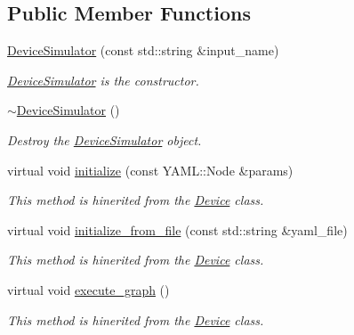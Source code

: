 \subsection*{Public Member Functions}
\begin{DoxyCompactItemize}
\item 
\hyperlink{classdynamic__graph_1_1DeviceSimulator_ad1c52d0a4bfa4617c7653532570a2c90}{Device\+Simulator} (const std\+::string \&input\+\_\+name)
\begin{DoxyCompactList}\small\item\em \hyperlink{classdynamic__graph_1_1DeviceSimulator}{Device\+Simulator} is the constructor. \end{DoxyCompactList}\item 
\hyperlink{classdynamic__graph_1_1DeviceSimulator_a7510771e215f2f20f05a5d4193dc4f76}{$\sim$\+Device\+Simulator} ()\hypertarget{classdynamic__graph_1_1DeviceSimulator_a7510771e215f2f20f05a5d4193dc4f76}{}\label{classdynamic__graph_1_1DeviceSimulator_a7510771e215f2f20f05a5d4193dc4f76}

\begin{DoxyCompactList}\small\item\em Destroy the \hyperlink{classdynamic__graph_1_1DeviceSimulator}{Device\+Simulator} object. \end{DoxyCompactList}\item 
virtual void \hyperlink{classdynamic__graph_1_1DeviceSimulator_a346995902653feca7707f8c62ab4bf95}{initialize} (const Y\+A\+M\+L\+::\+Node \&params)
\begin{DoxyCompactList}\small\item\em This method is hinerited from the \hyperlink{classdynamic__graph_1_1Device}{Device} class. \end{DoxyCompactList}\item 
virtual void \hyperlink{classdynamic__graph_1_1DeviceSimulator_a8a9370f236ba03162be2472c79f865f2}{initialize\+\_\+from\+\_\+file} (const std\+::string \&yaml\+\_\+file)
\begin{DoxyCompactList}\small\item\em This method is hinerited from the \hyperlink{classdynamic__graph_1_1Device}{Device} class. \end{DoxyCompactList}\item 
virtual void \hyperlink{classdynamic__graph_1_1DeviceSimulator_a614c51ee8d55765019ae98715f875ed5}{execute\+\_\+graph} ()
\begin{DoxyCompactList}\small\item\em This method is hinerited from the \hyperlink{classdynamic__graph_1_1Device}{Device} class. \end{DoxyCompactList}\end{DoxyCompactItemize}

